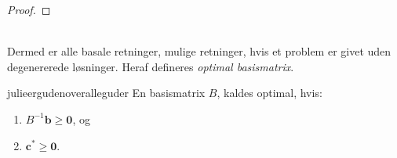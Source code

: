 {\begin{proof}
\end{proof}
\\
%
Dermed er alle basale retninger, mulige retninger, hvis et problem er givet uden degenererede løsninger. 
Heraf defineres \textit{optimal basismatrix}.
%
\begin{defn}{}{julieergudenoveralleguder}
En basismatrix $B$, kaldes optimal, hvis:
%
\begin{enumerate}[label = (\alph*)]
\item $B^{-1} \mathbf{b} \geq \mathbf{0}$, og
\item $\mathbf{c}^* \geq \mathbf{0}$.
\end{enumerate}
%
\end{defn}
\noindent
%
}
